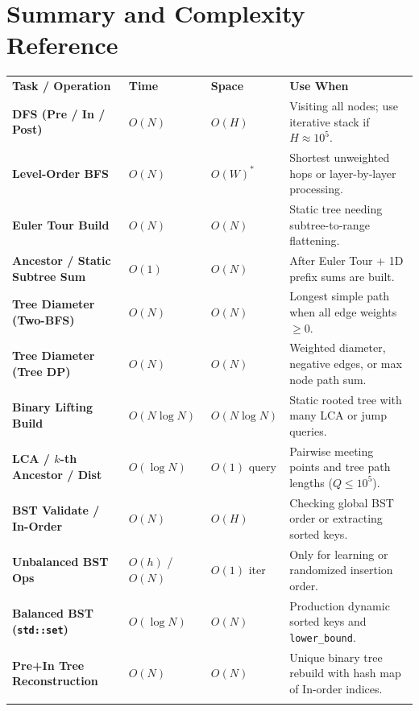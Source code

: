 \documentclass[11pt,a4paper]{article}
\theoremstyle{definition}
\begin{document}
\section{Summary and Complexity Reference}
\label{sec:summary}

\begingroup\small{}
\begin{tabularx}{\textwidth}{>{\raggedright\arraybackslash\bfseries}p{4.0cm} >{\centering\arraybackslash}p{2.3cm} >{\centering\arraybackslash}p{2.1cm} >{\raggedright\arraybackslash}X}
\arrayrulecolor{primaryblue}\toprule[1.2pt]
\rowcolor{primaryblue!10}
\textcolor{primaryblue}{\textbf{Task / Operation}} & \textcolor{primaryblue}{\textbf{Time}} & \textcolor{primaryblue}{\textbf{Space}} & \textcolor{primaryblue}{\textbf{Use When}} \\
\arrayrulecolor{codeframe}\midrule[0.6pt]
DFS (Pre / In / Post) & $O(N)$ & $O(H)$ & Visiting all nodes; use iterative stack if $H \approx 10^5$. \\
Level-Order BFS & $O(N)$ & $O(W)^*$ & Shortest unweighted hops or layer-by-layer processing. \\
Euler Tour Build & $O(N)$ & $O(N)$ & Static tree needing subtree-to-range flattening. \\
Ancestor / Static Subtree Sum & $O(1)$ & $O(N)$ & After Euler Tour + 1D prefix sums are built. \\
Tree Diameter (Two-BFS) & $O(N)$ & $O(N)$ & Longest simple path when all edge weights $\ge 0$. \\
Tree Diameter (Tree DP) & $O(N)$ & $O(N)$ & Weighted diameter, negative edges, or max node path sum. \\
Binary Lifting Build & $O(N \log N)$ & $O(N \log N)$ & Static rooted tree with many LCA or jump queries. \\
LCA / $k$-th Ancestor / Dist & $O(\log N)$ & $O(1)$ query & Pairwise meeting points and tree path lengths ($Q \le 10^5$). \\
BST Validate / In-Order & $O(N)$ & $O(H)$ & Checking global BST order or extracting sorted keys. \\
Unbalanced BST Ops & $O(h)$ / $O(N)$ & $O(1)$ iter & Only for learning or randomized insertion order. \\
Balanced BST (\texttt{std::set}) & $O(\log N)$ & $O(N)$ & Production dynamic sorted keys and \texttt{lower\_bound}. \\
Pre+In Tree Reconstruction & $O(N)$ & $O(N)$ & Unique binary tree rebuild with hash map of In-order indices. \\
\arrayrulecolor{primaryblue}\bottomrule[1.2pt]
\end{tabularx}\endgroup
\par\smallskip{}
\end{document}
